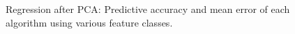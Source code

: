 \begin{figure}[t]
\centering
{}
\caption{Regression after PCA: Predictive accuracy and mean error of each algorithm using various feature classes.}
\label{linear_plus_pca}
\end{figure}
